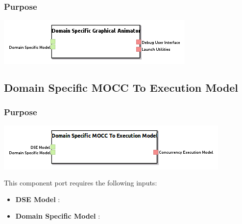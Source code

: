 \documentclass{gemoc} %
\begin{document}

\subsubsection{Purpose}


\begin{center}
\includegraphics*[trim=0.0cm 0.0cm 0cm 0.0cm, clip=true]{../images/generated/Generated_Domain_Specific_Graphical_Animator.png}
\end{center}




\subsection{Domain Specific MOCC To Execution Model}


\subsubsection{Purpose}


\begin{center}
\includegraphics*[trim=0.0cm 0.0cm 0cm 0.0cm, clip=true]{../images/generated/Generated_Domain_Specific_MOCC_To_Execution_Model.png}
\end{center}

This component port requires the following inputs:
\begin{itemize}
  \item \textbf{DSE Model} :
  \item \textbf{Domain Specific Model} :
\end{itemize}
\end{document}
